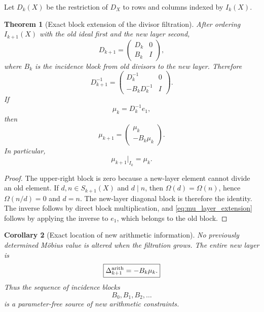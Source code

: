 \documentclass[11pt]{amsart}
\numberwithin{equation}{section}
\theoremstyle{plain}
\newtheorem{theorem}{Theorem}[section]
\newtheorem{corollary}[theorem]{Corollary}
\theoremstyle{definition}
\theoremstyle{remark}
\begin{document}
Let $D_k(X)$ be the restriction of $D_X$ to rows and columns indexed by $I_k(X)$.

\begin{theorem}[Exact block extension of the divisor filtration]
\label{thm:block_divisor_extension}
After ordering $I_{k+1}(X)$ with the old ideal first and the new layer second,
\begin{equation}
D_{k+1}
=
\begin{pmatrix}
D_k&0\\
B_k&I
\end{pmatrix},
\label{eq:D_block_extension}
\end{equation}
where $B_k$ is the incidence block from old divisors to the new layer.  Therefore
\begin{equation}
D_{k+1}^{-1}
=
\begin{pmatrix}
D_k^{-1}&0\\
-B_kD_k^{-1}&I
\end{pmatrix}.
\label{eq:Dinv_block_extension}
\end{equation}
If
\[
\mu_k=D_k^{-1}e_1,
\]
then
\begin{equation}
\boxed{
\mu_{k+1}
=
\begin{pmatrix}
\mu_k\\
-B_k\mu_k
\end{pmatrix}.
}
\label{eq:mu_layer_extension}
\end{equation}
In particular,
\begin{equation}
\mu_{k+1}|_{I_k}=\mu_k.
\label{eq:coherent_restriction}
\end{equation}
\end{theorem}

\begin{proof}
The upper-right block is zero because a new-layer element cannot divide an old element.
If $d,n\in S_{k+1}(X)$ and $d\mid n$, then
$\Omega(d)=\Omega(n)$, hence $\Omega(n/d)=0$ and $d=n$.  The new-layer diagonal block is therefore
the identity.  The inverse follows by direct block multiplication, and
\eqref{eq:mu_layer_extension} follows by applying the inverse to $e_1$, which belongs to the old
block.
\end{proof}

\begin{corollary}[Exact location of new arithmetic information]
\label{cor:new_arithmetic_information}
No previously determined M\"obius value is altered when the filtration grows.  The entire new
layer is
\begin{equation}
\boxed{\Delta_{k+1}^{\rm arith}=-B_k\mu_k.}
\label{eq:new_arithmetic_layer}
\end{equation}
Thus the sequence of incidence blocks
\[
B_0,B_1,B_2,\ldots
\]
is a parameter-free source of new arithmetic constraints.
\end{corollary}
\end{document}
